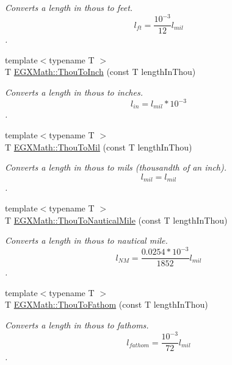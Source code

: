 \begin{DoxyCompactItemize}
\begin{DoxyCompactList}\small\item\em Converts a length in thous to feet. \[ l_{ft}= \frac{10^{-3}}{12} l_{mil} \]. \end{DoxyCompactList}\item 
{\footnotesize template$<$typename T $>$ }\\T \mbox{\hyperlink{group___e_g_x_math-_conversions-_length_conversions-_imperial-_thou-_imperial_gad8bbba80b7d752a5edd4453fef6c0772}{E\+G\+X\+Math\+::\+Thou\+To\+Inch}} (const T length\+In\+Thou)
\begin{DoxyCompactList}\small\item\em Converts a length in thous to inches. \[ l_{in}= l_{mil} * 10^{-3} \]. \end{DoxyCompactList}\item 
{\footnotesize template$<$typename T $>$ }\\T \mbox{\hyperlink{group___e_g_x_math-_conversions-_length_conversions-_imperial-_thou-_imperial_ga3e51ce22cf63efe45874ca707dbc1506}{E\+G\+X\+Math\+::\+Thou\+To\+Mil}} (const T length\+In\+Thou)
\begin{DoxyCompactList}\small\item\em Converts a length in thous to mils (thousandth of an inch). \[ l_{mil}=l_{mil} \]. \end{DoxyCompactList}\item 
{\footnotesize template$<$typename T $>$ }\\T \mbox{\hyperlink{group___e_g_x_math-_conversions-_length_conversions-_imperial-_thou-_nautical_gadd6e063edb182d6461d6c35f4070072d}{E\+G\+X\+Math\+::\+Thou\+To\+Nautical\+Mile}} (const T length\+In\+Thou)
\begin{DoxyCompactList}\small\item\em Converts a length in thous to nautical mile. \[ l_{NM}= \frac{0.0254 * 10^{-3}}{1852} l_{mil} \]. \end{DoxyCompactList}\item 
{\footnotesize template$<$typename T $>$ }\\T \mbox{\hyperlink{group___e_g_x_math-_conversions-_length_conversions-_imperial-_thou-_nautical_ga00618d821c88aa01407d6770bcb1c5de}{E\+G\+X\+Math\+::\+Thou\+To\+Fathom}} (const T length\+In\+Thou)
\begin{DoxyCompactList}\small\item\em Converts a length in thous to fathoms. \[ l_{fathom}= \frac{10^{-3}}{72} l_{mil} \]. \end{DoxyCompactList}\item 

\end{DoxyCompactItemize}
